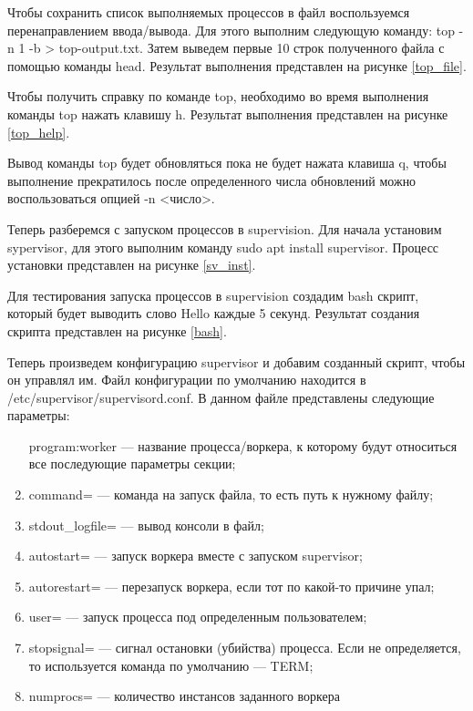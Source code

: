 Чтобы сохранить список выполняемых процессов в файл воспользуемся перенаправлением ввода/вывода. Для этого выполним следующую команду: top -n 1 -b > top-output.txt. Затем выведем первые 10 строк полученного файла с помощью команды head. Результат выполнения представлен на рисунке \ref{top_file}.


Чтобы получить справку по команде top, необходимо во время выполнения команды top нажать клавишу h. Результат выполнения представлен на рисунке \ref{top_help}.


Вывод команды top будет обновляться пока не будет нажата клавиша q, чтобы выполнение прекратилось после определенного числа обновлений можно воспользоваться опцией -n <число>.

Теперь разберемся с запуском процессов в supervision. Для начала установим sypervisor, для этого выполним команду sudo apt install supervisor. Процесс установки представлен на рисунке \ref{sv_inst}.


Для тестирования запуска процессов в supervision создадим bash скрипт, который будет выводить слово Hello каждые 5 секунд. Результат создания скрипта представлен на рисунке \ref{bash}.


Теперь произведем конфигурацию supervisor и добавим созданный скрипт, чтобы он управлял им. Файл конфигурации по умолчанию находится в /etc/supervisor/supervisord.conf. В данном файле представлены следующие параметры:
\begin{enumerate}
    \item [program:worker] — название процесса/воркера, к которому будут относиться все последующие параметры секции;
    \item command= — команда на запуск файла, то есть путь к нужному файлу;
    \item stdout\_logfile= — вывод консоли в файл;
    \item autostart= — запуск воркера вместе с запуском supervisor;
    \item autorestart= — перезапуск воркера, если тот по какой-то причине упал;
    \item user= — запуск процесса под определенным пользователем;
    \item stopsignal= — сигнал остановки (убийства) процесса. Если не определяется, то используется команда по умолчанию — TERM;
    \item numprocs= — количество инстансов заданного воркера
\end{enumerate}

